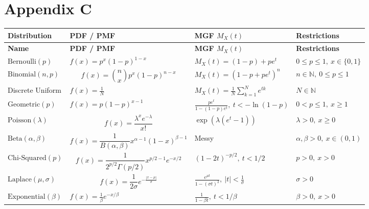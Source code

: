 \section{Appendix C }\label{s: app_C}
\renewcommand{\arraystretch}{1.5}
\begin{longtable}{|p{2.5cm}|p{5.5cm}|p{4.5cm}|p{3.0cm}|}
\hline
\textbf{Distribution} & \textbf{PDF / PMF} & \textbf{MGF \(M_X(t)\)} & \textbf{Restrictions} \\
\hline
\endfirsthead
\hline
\textbf{Name} & \textbf{PDF / PMF} & \textbf{MGF \(M_X(t)\)} & \textbf{Restrictions} \\
\hline
\endhead

\( \text{Bernoulli}(p) \) & \( f(x) = p^x(1-p)^{1-x} \) & \( M_X(t) = (1 - p) + pe^t \) & \( 0 \leq p \leq 1, \ x \in \{0,1\}\) \\
\hline

\( \text{Binomial}(n, p) \) & \[ f(x) = \binom{n}{x} p^x (1-p)^{n-x} \] & \( M_X(t) = (1 - p + pe^t)^n \) & \( n \in \mathbb{N},\ 0 \leq p \leq 1 \) \\
\hline

Discrete Uniform  & \( f(x) = \frac{1}{N} \) & \( M_X(t) = \frac{1}{N} \sum_{k=1}^N e^{tk} \) & \( N \in \mathbb{N} \) \\
\hline

\( \text{Geometric}(p) \) & \( f(x) = p(1-p)^{x-1}\) & \( \frac{pe^t}{1 - (1 - p)e^t},\ t < -\ln(1 - p) \) & \( 0 < p \leq 1,\ x \geq 1  \) \\
\hline

\( \text{Poisson}(\lambda) \) & \[ f(x) = \frac{\lambda^x e^{-\lambda}}{x!}\] & \( \exp(\lambda(e^t - 1)) \) & \( \lambda > 0,\ x \geq 0  \) \\
\hline

\( \text{Beta}(\alpha, \beta) \) & \[ f(x) = \frac{1}{B(\alpha, \beta)} x^{\alpha-1}(1-x)^{\beta-1}\] & Messy & \( \alpha, \beta > 0,\ x \in (0,1)  \) \\
\hline

\( \text{Chi-Squared}(p) \) & \[ f(x) = \frac{1}{2^{p/2}\Gamma(p/2)} x^{p/2 - 1} e^{-x/2}\] & \( (1 - 2t)^{-p/2},\ t < 1/2 \) & \( p > 0,\ x > 0  \) \\
\hline

\( \text{Laplace}(\mu, \sigma) \) & \[ f(x) = \frac{1}{2\sigma} e^{-\frac{|x - \mu|}{\sigma}} \] & \( \frac{e^{\mu t}}{1 - (\sigma t)^2},\ |t| < \frac{1}{\sigma} \) & \( \sigma > 0 \) \\
\hline

\( \text{Exponential}(\beta) \) & \( f(x) = \frac{1}{\beta} e^{-x/\beta} \) & \( \frac{1}{1 - \beta t},\ t < 1/\beta \) & \( \beta > 0,\ x > 0 \) \\
\hline


\end{longtable}
